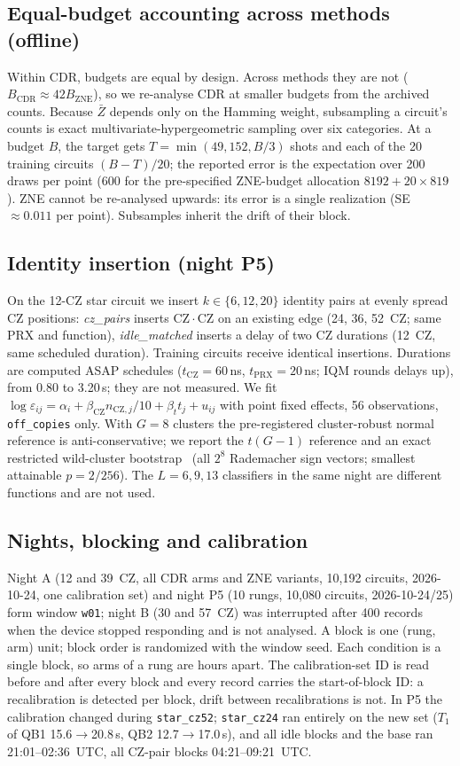 \documentclass[conference]{IEEEtran}
\newcommand{\CZ}{\mathrm{CZ}}
\newcommand{\arm}[1]{\texttt{#1}}
\begin{document}
\subsection{Equal-budget accounting across methods (offline)}
Within CDR, budgets are equal by design. Across methods they are not ($B_{\text{CDR}}\approx
42B_{\text{ZNE}}$), so we re-analyse CDR at smaller budgets from the archived counts. Because
$\bar Z$ depends only on the Hamming weight, subsampling a circuit's counts is exact
multivariate-hypergeometric sampling over six categories. At a budget $B$, the target gets
$T=\min(49{,}152,B/3)$ shots and each of the 20 training circuits $(B-T)/20$; the reported
error is the expectation over 200 draws per point (600 for the pre-specified ZNE-budget
allocation $8192+20\times819$). ZNE cannot be re-analysed upwards: its error is a single
realization (SE $\approx0.011$ per point). Subsamples inherit the drift of their block.

\subsection{Identity insertion (night P5)}
On the 12-CZ star circuit we insert $k\in\{6,12,20\}$ identity pairs at evenly spread CZ
positions: \emph{cz\_pairs} inserts $\CZ\cdot\CZ$ on an existing edge (24, 36, 52~CZ; same PRX
and function), \emph{idle\_matched} inserts a delay of two CZ durations (12~CZ, same scheduled
duration). Training circuits receive identical insertions. Durations are computed ASAP
schedules ($t_{\text{CZ}}=60$\,ns, $t_{\text{PRX}}=20$\,ns; IQM rounds delays up), from 0.80 to
3.20\,\textmu s; they are not measured. We fit
$\log\varepsilon_{ij}=\alpha_i+\beta_{\text{CZ}}n_{\text{CZ},j}/10+\beta_t t_j+u_{ij}$
with point fixed effects, 56 observations, \arm{off\_copies} only. With $G=8$ clusters the
pre-registered cluster-robust normal reference is anti-conservative; we report the $t(G-1)$
reference and an exact restricted wild-cluster bootstrap~\cite{cameron2008} (all $2^8$
Rademacher sign vectors; smallest attainable $p=2/256$). The $L=6,9,13$ classifiers in the same
night are different functions and are not used.

\subsection{Nights, blocking and calibration}
Night A (12 and 39~CZ, all CDR arms and ZNE variants, 10,192 circuits, 2026-10-24, one
calibration set) and night P5 (10 rungs, 10,080 circuits, 2026-10-24/25) form window
\texttt{w01}; night B (30 and 57~CZ) was interrupted after 400 records when the device stopped
responding and is not analysed. A block is one (rung, arm) unit; block order is randomized
with the window seed. Each condition is a single block, so arms of a rung are hours apart.
The calibration-set ID is read before and after every block and every record carries the
start-of-block ID: a recalibration is detected per block, drift between recalibrations is
not. In P5 the calibration changed during \texttt{star\_cz52}; \texttt{star\_cz24} ran
entirely on the new set ($T_1$ of QB1 15.6$\to$20.8\,\textmu s, QB2 12.7$\to$17.0\,\textmu s), and
all idle blocks and the base ran 21:01--02:36~UTC, all CZ-pair blocks 04:21--09:21~UTC.
\end{document}

